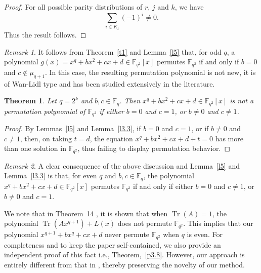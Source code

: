 \documentclass[12pt]{amsart}
\newtheorem{theorem}{Theorem}[section]
\theoremstyle{definition}
\theoremstyle{remark}
\newtheorem{remark}{Remark}
\numberwithin{equation}{section}
\begin{document}
\begin{proof}
For all possible parity distributions of $r$, $j$ and $k$, we have
$$
\sum_{i\in K_t} (-1)^i \neq 0.
$$
Thus the result follows.

\end{proof}

\begin{remark}\label{r1}
It follows from Theorem~\ref{t1} and Lemma~\ref{l5} that, for odd $q$, a polynomial
$g(x)=x^q+bx^2+cx+d\in\mathbb{F}_{q^2}[x]$ permutes $\mathbb{F}_{q^2}$ if and only if $b=0$ and $c\notin\mu_{q+1}$. In this case, the resulting permutation polynomial is not new, it is of Wan-Lidl type and has been studied extensively in the literature.
\end{remark}
\begin{theorem}\label{tn2}
Let $q=2^k$ and $b,c \in \mathbb{F}_q$.
Then $x^q+bx^2+cx+d\in\mathbb{F}_{q^2}[x]$ is not a permutation polynomial of $\mathbb{F}_{q^2}$ if either $b=0$ and $c=1$, or $
b\neq0$ and $c\neq1$.
\end{theorem}
\begin{proof}
By Lemmas~\ref{l5} and Lemma~\ref{l3.3}, if $b=0$ and $c=1$, or if $b\neq 0$ and $c\neq 1$, then, on taking $t=d$, the equation
$x^q+bx^2+cx+d+t=0$
has more than one solution in $\mathbb{F}_{q^2}$, thus failing to display permutation behavior.
\end{proof}
\begin{remark}\label{r11}
A clear consequence of the above discussion and Lemma~\ref{l5} and Lemma~\ref{l3.3} is that, for even $q$ and
$b,c\in\mathbb{F}_q$, the polynomial
$x^q+bx^2+cx+d\in\mathbb{F}_{q^2}[x]$
permutes $\mathbb{F}_{q^2}$ if and only if either
$b=0$ and $c\neq 1$,
or
$b\neq0$ and $c=1$.
\end{remark}

We note that in Theorem~14 \cite{pp2}, it is shown that when $\operatorname{Tr}(A)=1$, the polynomial $\operatorname{Tr}(A x^{q+1}) + L(x)$ does not permute $\mathbb{F}_{q^2}$. This implies that our polynomial $x^{q+1} + b x^q + c x + d$ never permute $\mathbb{F}_{q^2}$ when $q$ is even. For completeness and to keep the paper self-contained, we also provide an independent proof of this fact i.e., Theorem,~\ref{p3.8}. However, our approach is entirely different from that in \cite{pp2}, thereby preserving the novelty of our method.
\end{document}
